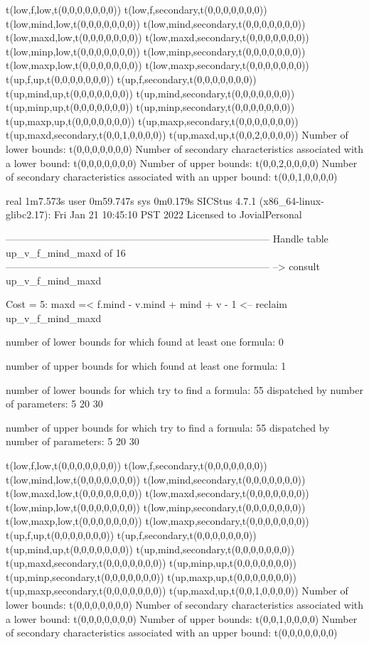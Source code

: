 t(low,f,low,t(0,0,0,0,0,0,0))
t(low,f,secondary,t(0,0,0,0,0,0,0))
t(low,mind,low,t(0,0,0,0,0,0,0))
t(low,mind,secondary,t(0,0,0,0,0,0,0))
t(low,maxd,low,t(0,0,0,0,0,0,0))
t(low,maxd,secondary,t(0,0,0,0,0,0,0))
t(low,minp,low,t(0,0,0,0,0,0,0))
t(low,minp,secondary,t(0,0,0,0,0,0,0))
t(low,maxp,low,t(0,0,0,0,0,0,0))
t(low,maxp,secondary,t(0,0,0,0,0,0,0))
t(up,f,up,t(0,0,0,0,0,0,0))
t(up,f,secondary,t(0,0,0,0,0,0,0))
t(up,mind,up,t(0,0,0,0,0,0,0))
t(up,mind,secondary,t(0,0,0,0,0,0,0))
t(up,minp,up,t(0,0,0,0,0,0,0))
t(up,minp,secondary,t(0,0,0,0,0,0,0))
t(up,maxp,up,t(0,0,0,0,0,0,0))
t(up,maxp,secondary,t(0,0,0,0,0,0,0))
t(up,maxd,secondary,t(0,0,1,0,0,0,0))
t(up,maxd,up,t(0,0,2,0,0,0,0))
Number of lower bounds:                                             t(0,0,0,0,0,0,0)
Number of secondary characteristics associated with a lower bound:  t(0,0,0,0,0,0,0)
Number of upper bounds:                                             t(0,0,2,0,0,0,0)
Number of secondary characteristics associated with an upper bound: t(0,0,1,0,0,0,0)

real	1m7.573s
user	0m59.747s
sys	0m0.179s
SICStus 4.7.1 (x86_64-linux-glibc2.17): Fri Jan 21 10:45:10 PST 2022
Licensed to JovialPersonal


--------------------------------------------------------------------------------
Handle table up_v_f_mind_maxd of 16
--------------------------------------------------------------------------------
--> consult up_v_f_mind_maxd

Cost =  5:  maxd =< f.mind - v.mind + mind + v - 1
<-- reclaim up_v_f_mind_maxd

number of lower bounds for which found at least one formula: 0

number of upper bounds for which found at least one formula: 1

number of lower bounds for which try to find a formula: 55
dispatched by number of parameters: 5  20  30

number of upper bounds for which try to find a formula: 55
dispatched by number of parameters: 5  20  30

t(low,f,low,t(0,0,0,0,0,0,0))
t(low,f,secondary,t(0,0,0,0,0,0,0))
t(low,mind,low,t(0,0,0,0,0,0,0))
t(low,mind,secondary,t(0,0,0,0,0,0,0))
t(low,maxd,low,t(0,0,0,0,0,0,0))
t(low,maxd,secondary,t(0,0,0,0,0,0,0))
t(low,minp,low,t(0,0,0,0,0,0,0))
t(low,minp,secondary,t(0,0,0,0,0,0,0))
t(low,maxp,low,t(0,0,0,0,0,0,0))
t(low,maxp,secondary,t(0,0,0,0,0,0,0))
t(up,f,up,t(0,0,0,0,0,0,0))
t(up,f,secondary,t(0,0,0,0,0,0,0))
t(up,mind,up,t(0,0,0,0,0,0,0))
t(up,mind,secondary,t(0,0,0,0,0,0,0))
t(up,maxd,secondary,t(0,0,0,0,0,0,0))
t(up,minp,up,t(0,0,0,0,0,0,0))
t(up,minp,secondary,t(0,0,0,0,0,0,0))
t(up,maxp,up,t(0,0,0,0,0,0,0))
t(up,maxp,secondary,t(0,0,0,0,0,0,0))
t(up,maxd,up,t(0,0,1,0,0,0,0))
Number of lower bounds:                                             t(0,0,0,0,0,0,0)
Number of secondary characteristics associated with a lower bound:  t(0,0,0,0,0,0,0)
Number of upper bounds:                                             t(0,0,1,0,0,0,0)
Number of secondary characteristics associated with an upper bound: t(0,0,0,0,0,0,0)

